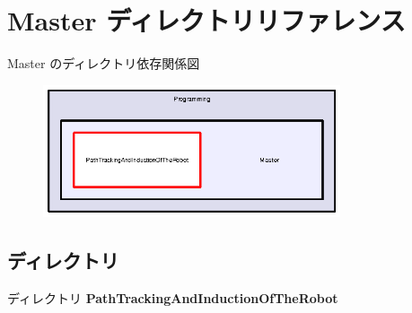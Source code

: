 \section{Master ディレクトリリファレンス}
\label{dir_f222f4b39d8b1349931d836df5dbea5a}
Master のディレクトリ依存関係図\nopagebreak
\begin{figure}[H]
\begin{center}
\leavevmode
\includegraphics[width=248pt]{dir_f222f4b39d8b1349931d836df5dbea5a_dep}
\end{center}
\end{figure}
\subsection*{ディレクトリ}
\begin{DoxyCompactItemize}
\item 
ディレクトリ {\bf Path\-Tracking\-And\-Induction\-Of\-The\-Robot}
\end{DoxyCompactItemize}
